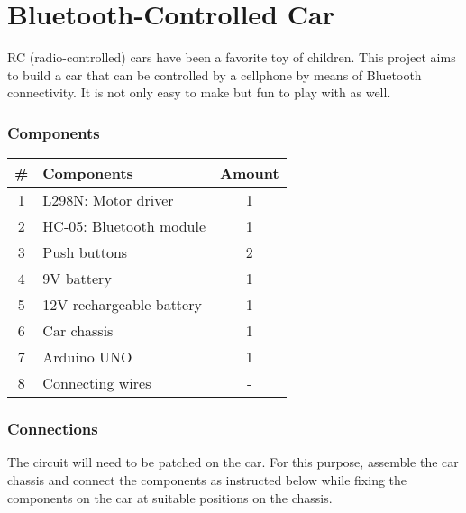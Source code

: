 \chapter{Bluetooth-Controlled Car}

RC (radio-controlled) cars have been a favorite toy of children. This project aims to build a car that can be controlled by a cellphone by means of Bluetooth connectivity. It is not only easy to make but fun to play with as well.


\subsection*{Components}
\begin{table}[H]
    \centering
    \begin{tabular}{|c|l|c|}\hline
     \textbf{\#} & \textbf{Components} &  \textbf{Amount}\\\hline
     1 & L298N: Motor driver       & 1\\\hline
     2 & HC-05: Bluetooth module    & 1 \\\hline
     3 & Push buttons               & 2 \\\hline
     4 & 9V battery                 & 1 \\\hline
     5 & 12V rechargeable battery   & 1 \\\hline
     6 & Car chassis                & 1 \\\hline
     7 & Arduino UNO                & 1 \\\hline
     8 & Connecting wires           & - \\\hline
    \end{tabular}
\end{table}

\subsection*{Connections}
The circuit will need to be patched on the car. For this purpose, assemble the car chassis and connect the components as instructed below while fixing the components on the car at suitable positions on the chassis.


